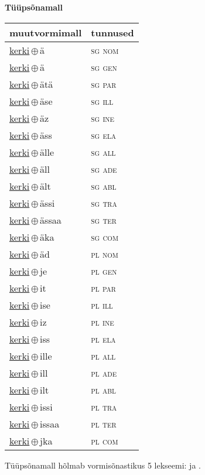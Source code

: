 

\vspace{3.5em}
\noindent \begin{minipage}{\textwidth}
\noindent \textbf{Tüüpsõnamall \,}\\

\begin{sideways}
\begin{tabular}{l l}
muutvormimall & tunnused \\
\hline
\underline{kerki}\,$\oplus$\,ä & \textsc{ sg nom } \\
\underline{kerki}\,$\oplus$\,ä & \textsc{ sg gen } \\
\underline{kerki}\,$\oplus$\,ätä & \textsc{ sg par } \\
\underline{kerki}\,$\oplus$\,äse & \textsc{ sg ill } \\
\underline{kerki}\,$\oplus$\,äz & \textsc{ sg ine } \\
\underline{kerki}\,$\oplus$\,äss & \textsc{ sg ela } \\
\underline{kerki}\,$\oplus$\,älle & \textsc{ sg all } \\
\underline{kerki}\,$\oplus$\,äll & \textsc{ sg ade } \\
\underline{kerki}\,$\oplus$\,ält & \textsc{ sg abl } \\
\underline{kerki}\,$\oplus$\,ässi & \textsc{ sg tra } \\
\underline{kerki}\,$\oplus$\,ässaa & \textsc{ sg ter } \\
\underline{kerki}\,$\oplus$\,äka & \textsc{ sg com } \\
\underline{kerki}\,$\oplus$\,äd & \textsc{ pl nom } \\
\underline{kerki}\,$\oplus$\,je & \textsc{ pl gen } \\
\underline{kerki}\,$\oplus$\,it & \textsc{ pl par } \\
\underline{kerki}\,$\oplus$\,ise & \textsc{ pl ill } \\
\underline{kerki}\,$\oplus$\,iz & \textsc{ pl ine } \\
\underline{kerki}\,$\oplus$\,iss & \textsc{ pl ela } \\
\underline{kerki}\,$\oplus$\,ille & \textsc{ pl all } \\
\underline{kerki}\,$\oplus$\,ill & \textsc{ pl ade } \\
\underline{kerki}\,$\oplus$\,ilt & \textsc{ pl abl } \\
\underline{kerki}\,$\oplus$\,issi & \textsc{ pl tra } \\
\underline{kerki}\,$\oplus$\,issaa & \textsc{ pl ter } \\
\underline{kerki}\,$\oplus$\,jka & \textsc{ pl com } \\
\end{tabular}
\end{sideways}
\label{tab:tüüpsõnamall-kerkiä}

\end{minipage}

 
\vspace{1em}
\noindent Tüüpsõnamall  hõlmab vormisõnastikus 5 lekseemi:  ja .
